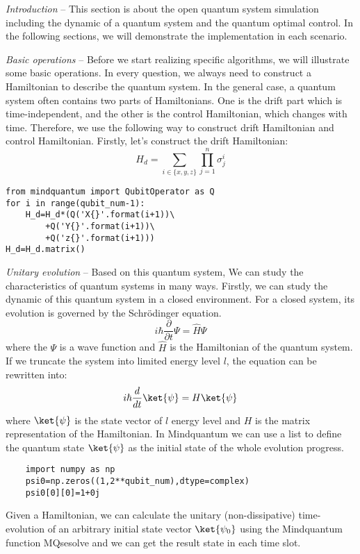 \textit{Introduction} -- This section is about the open quantum system simulation including the dynamic of a quantum system and the quantum optimal control. In the following sections, we will demonstrate the implementation in each scenario.

\textit{Basic operations} -- Before we start realizing specific algorithms, we will illustrate some basic operations. In every question, we always need to construct a Hamiltonian to describe the quantum system. In the general case, a quantum system often contains two parts of Hamiltonians. One is the drift part which is time-independent, and the other is the control Hamiltonian, which changes with time. Therefore, we use the following way to construct drift Hamiltonian and control Hamiltonian. Firstly, let's construct the drift Hamiltonian:
\begin{equation}
    H_{d}=\sum_{i\in\{x,y,z\}}\prod_{j=1}^{n}\sigma_{j}^{i}
\end{equation}
\begin{lstlisting}
from mindquantum import QubitOperator as Q
for i in range(qubit_num-1):
    H_d=H_d*(Q('X{}'.format(i+1))\
        +Q('Y{}'.format(i+1))\
        +Q('z{}'.format(i+1)))
H_d=H_d.matrix()
\end{lstlisting}
\textit{Unitary evolution} -- Based on this quantum system, We can study the characteristics of quantum systems in many ways. Firstly, we can study the dynamic of this quantum system in a closed environment. For a closed system, its evolution is governed by the Schrödinger equation.
\begin{equation}
    i\hbar\frac{\partial}{\partial t}\Psi=\hat{H}\Psi
\end{equation}
where the $\Psi$ is a wave function and $\hat{H}$ is the Hamiltonian of the quantum system. If we truncate the system into limited energy level $l$, the equation can be rewritten into:
\begin{equation}
    i\hbar\frac{d}{dt}\ket{\psi}=H\ket{\psi}
    \label{shro}
\end{equation}
where $\ket{\psi}$ is the state vector of $l$ energy level and $H$ is the matrix representation of the Hamiltonian. In Mindquantum we can use a list to define the quantum state $\ket{\psi}$ as the initial state of the whole evolution progress. 
\begin{lstlisting}
    import numpy as np
    psi0=np.zeros((1,2**qubit_num),dtype=complex)
    psi0[0][0]=1+0j
\end{lstlisting}
Given a Hamiltonian, we can calculate the unitary (non-dissipative) time-evolution of an arbitrary initial state vector $\ket{\psi_{0}}$ using the Mindquantum function MQsesolve and we can get the result state in each time slot.
